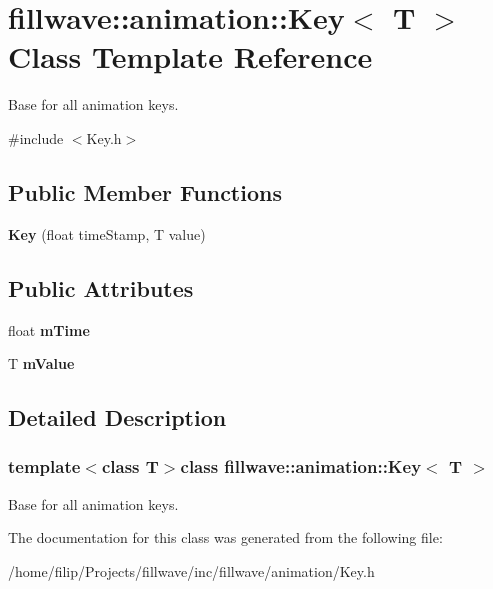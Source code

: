 \hypertarget{classfillwave_1_1animation_1_1Key}{}\section{fillwave\+:\+:animation\+:\+:Key$<$ T $>$ Class Template Reference}
\label{classfillwave_1_1animation_1_1Key}


Base for all animation keys.  




{\ttfamily \#include $<$Key.\+h$>$}

\subsection*{Public Member Functions}
\begin{DoxyCompactItemize}
\item 
\hypertarget{classfillwave_1_1animation_1_1Key_aee5c9d28fdf14878b69f95dc203faada}{}{\bfseries Key} (float time\+Stamp, T value)\label{classfillwave_1_1animation_1_1Key_aee5c9d28fdf14878b69f95dc203faada}

\end{DoxyCompactItemize}
\subsection*{Public Attributes}
\begin{DoxyCompactItemize}
\item 
\hypertarget{classfillwave_1_1animation_1_1Key_ae64b38b95a06e3874520bd006452be2a}{}float {\bfseries m\+Time}\label{classfillwave_1_1animation_1_1Key_ae64b38b95a06e3874520bd006452be2a}

\item 
\hypertarget{classfillwave_1_1animation_1_1Key_a3a656264ec7dd546029e87c6a819c277}{}T {\bfseries m\+Value}\label{classfillwave_1_1animation_1_1Key_a3a656264ec7dd546029e87c6a819c277}

\end{DoxyCompactItemize}


\subsection{Detailed Description}
\subsubsection*{template$<$class T$>$class fillwave\+::animation\+::\+Key$<$ T $>$}

Base for all animation keys. 

The documentation for this class was generated from the following file\+:\begin{DoxyCompactItemize}
\item 
/home/filip/\+Projects/fillwave/inc/fillwave/animation/Key.\+h\end{DoxyCompactItemize}
